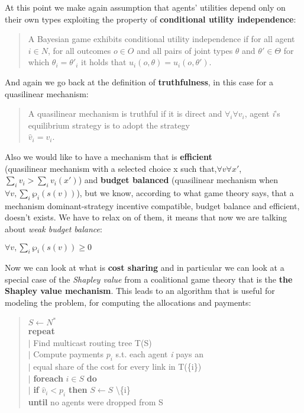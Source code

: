 \documentclass{article}
\begin{document}
{\begin{quote}
\end{quote}
At this point we make again assumption that agents' utilities depend only on their own types exploiting the property of \textbf{conditional utility independence}:
\begin{quote}
    A Bayesian game exhibits conditional utility independence if for all agent $i \in N$, for all outcomes $o \in O$ and all pairs of joint types $\theta$ and $\theta' \in \Theta$ for which $\theta_i = \theta'_i$ it holds that $u_i(o,\theta) = u_i(o,\theta')$. 
\end{quote}
And again we go back at the definition of \textbf{truthfulness}, in this case for a quasilinear mechanism:
\begin{quote}
    A quasilinear mechanism is truthful if it is direct and $\forall _i \forall v_i$, agent \textit{i}'s equilibrium strategy is to adopt the strategy\\ $\hat{v}_i = v_i$.
\end{quote}
Also we would like to have a mechanism that is \textbf{efficient} \\(quasilinear mechanism with a selected choice x such that,\newpage $\forall v \forall x'$, $\displaystyle \sum_{i} v_i > \displaystyle \sum_{i} v_i(x')$) and \textbf{budget balanced} (quasilinear mechanism when $\forall v,\displaystyle\sum_{i} \wp_i (s(v))$), but we know, according to what game theory says, that a mechanism dominant-strategy incentive compatible, budget balance and efficient, doesn't exists. We have to relax on of them, it means that now we are talking about \textit{weak budget balance}:
\begin{center}
    $\forall v, \sum_{i} \wp_i(s(v)) \ge 0$
\end{center}
Now we can look at what is \textbf{cost sharing} and in particular we can look at a special case of the \textit{Shapley value} from a coalitional game theory that is the \textbf{the Shapley value mechanism}. This leads to an algorithm that is useful for modeling the problem, for computing the allocations and payments:
\begin{quote}
    $S \leftarrow N^*$\\
    \textbf{repeat}\\
    $\vert$ Find multicast routing tree T(S)\\
    $\vert$ Compute payments $p_i$ s.t. each agent \textit{i} pays an\\
    $\vert$ equal share of the cost for every link in T(\{i\})\\
    $\vert$ \textbf{foreach} $i \in S$ \textbf{do}\\
    $\vert$ \qquad \textbf{if} $\hat{v}_i < p_i$ \textbf{then} $S \leftarrow S$ \textbackslash \{i\}\\
    \textbf{until} no agents were dropped from S
\end{quote}

}
\end{document}
